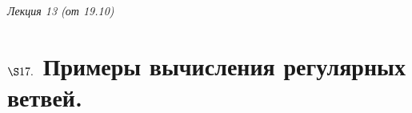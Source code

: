 \begin{flushright}
    \textit{Лекция 13 (от 19.10)}
\end{flushright}
\section{$\S 17.$ Примеры вычисления регулярных ветвей.}
